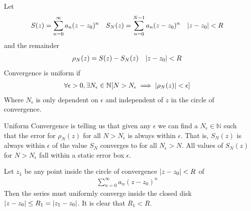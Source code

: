 \documentclass[12pt, english]{book}
\begin{document}
	\begin{definition}
		\label{Uniform Convergence (Power Series) Definition - Complex}
		Let 
		\begin{align*}
			S(z) &= \sum_{n=0}^{\infty} a_n(z-z_0)^n  &
			S_N(z) &= \sum_{n=0}^{N-1} a_n(z-z_0)^n &
				\abs{z-z_0}<R
		\end{align*}
		and the remainder 
		\begin{align*}
			\rho_N (z) &= S(z) - S_N(z)		&	\abs{z-z_0} < R
		\end{align*}
		Convergence is uniform if 
		\begin{align*}
			\forall \epsilon > 0, \exists N_\epsilon \in \mathbb{N} [N > N_\epsilon \implies \abs{\rho_N(z)} < \epsilon]
		\end{align*}
		Where \(N_\epsilon\) is only dependent on \(\epsilon\) and independent of \(z\) in the circle of convergence.
	\end{definition}

	Uniform Convergence is telling us that given any \(\epsilon\) we can find a \(N_\epsilon \in \mathbb{N}\) such that the error for \(\rho_N(z)\) for all \(N > N_\epsilon\) is always within \(\epsilon\). That is, \(S_N(z)\) is always within \(\epsilon\) of the value \(S_N\) converges to for all \(N_\epsilon > N\). All values of \(S_N(z)\) for \(N > N_\epsilon\) fall within a static error box \(\epsilon\).

	\begin{theorem}
		\label{Local Uniform Convergence of Power Series Theorem - Complex}
		Let \(z_1\) be any point inside the circle of convergence \(\abs{z-z_0}<R\) of 
		\begin{align*}
			\sum_{n=0}^{\infty} a_n (z-z_0)^n
		\end{align*}
		Then the series must uniformly converge inside the closed disk \(\abs{z-z_0}\leq R_1 = \abs{z_1 - z_0}\). It is clear that \(R_1 < R\).
	\end{theorem}
\end{document}
